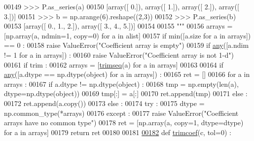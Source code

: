 \begin{DoxyCode}
00149 \textcolor{stringliteral}{    >>> P.as\_series(a)}
00150 \textcolor{stringliteral}{    [array([ 0.]), array([ 1.]), array([ 2.]), array([ 3.])]}
00151 \textcolor{stringliteral}{    >>> b = np.arange(6).reshape((2,3))}
00152 \textcolor{stringliteral}{    >>> P.as\_series(b)}
00153 \textcolor{stringliteral}{    [array([ 0.,  1.,  2.]), array([ 3.,  4.,  5.])]}
00154 \textcolor{stringliteral}{}
00155 \textcolor{stringliteral}{    """}
00156     arrays = [np.array(a, ndmin=1, copy=0) \textcolor{keywordflow}{for} a \textcolor{keywordflow}{in} alist]
00157     \textcolor{keywordflow}{if} min([a.size \textcolor{keywordflow}{for} a \textcolor{keywordflow}{in} arrays]) == 0 :
00158         \textcolor{keywordflow}{raise} ValueError(\textcolor{stringliteral}{"Coefficient array is empty"})
00159     \textcolor{keywordflow}{if} \hyperlink{namespacepyneb_1_1utils_1_1polyutils_a7a16ae5631115dce0a513eaec3a06470}{any}([a.ndim != 1 \textcolor{keywordflow}{for} a \textcolor{keywordflow}{in} arrays]) :
00160         \textcolor{keywordflow}{raise} ValueError(\textcolor{stringliteral}{"Coefficient array is not 1-d"})
00161     \textcolor{keywordflow}{if} trim :
00162         arrays = [\hyperlink{namespacepyneb_1_1utils_1_1polyutils_a2d09c123dbbcfd4623784cacf1fc945c}{trimseq}(a) \textcolor{keywordflow}{for} a \textcolor{keywordflow}{in} arrays]
00163 
00164     \textcolor{keywordflow}{if} \hyperlink{namespacepyneb_1_1utils_1_1polyutils_a7a16ae5631115dce0a513eaec3a06470}{any}([a.dtype == np.dtype(object) \textcolor{keywordflow}{for} a \textcolor{keywordflow}{in} arrays]) :
00165         ret = []
00166         \textcolor{keywordflow}{for} a \textcolor{keywordflow}{in} arrays :
00167             \textcolor{keywordflow}{if} a.dtype != np.dtype(object) :
00168                 tmp = np.empty(len(a), dtype=np.dtype(object))
00169                 tmp[:] = a[:]
00170                 ret.append(tmp)
00171             \textcolor{keywordflow}{else} :
00172                 ret.append(a.copy())
00173     \textcolor{keywordflow}{else} :
00174         \textcolor{keywordflow}{try} :
00175             dtype = np.common\_type(*arrays)
00176         \textcolor{keywordflow}{except} :
00177             \textcolor{keywordflow}{raise} ValueError(\textcolor{stringliteral}{"Coefficient arrays have no common type"})
00178         ret = [np.array(a, copy=1, dtype=dtype) \textcolor{keywordflow}{for} a \textcolor{keywordflow}{in} arrays]
00179     \textcolor{keywordflow}{return} ret
00180 
00181 
\hypertarget{polyutils_8py_source_l00182}{}\hyperlink{namespacepyneb_1_1utils_1_1polyutils_a505e3038cfd08b7f444ecca2234daa46}{00182} \textcolor{keyword}{def }\hyperlink{namespacepyneb_1_1utils_1_1polyutils_a505e3038cfd08b7f444ecca2234daa46}{trimcoef}(c, tol=0) :

\end{DoxyCode}
